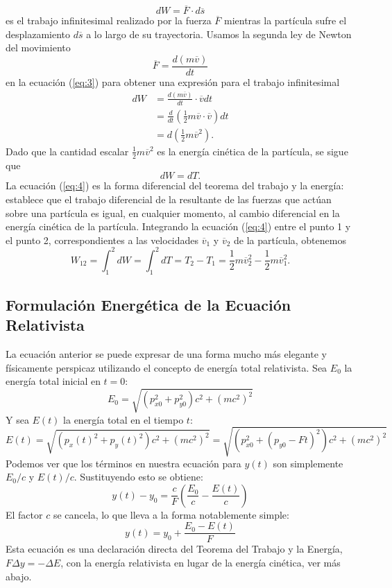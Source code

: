 \documentclass[11pt,a4paper]{article}
\begin{document}
\begin{equation}
dW = \overline{F} \cdot d\overline{s} \label{eq:3}
\end{equation}
es el trabajo infinitesimal realizado por la fuerza $\overline{F}$ mientras la partícula sufre el desplazamiento $d\overline{s}$ a lo largo de su trayectoria. Usamos la segunda ley de Newton del movimiento
\begin{equation}
\overline{F} = \frac{d(m\overline{v})}{dt}
\end{equation}
en la ecuación (\ref{eq:3}) para obtener una expresión para el trabajo infinitesimal
\begin{align*}
dW &= \frac{d(m\overline{v})}{dt} \cdot \overline{v}dt \\
&= \frac{d}{dt}\left(\frac{1}{2}m\overline{v}\cdot\overline{v}\right)dt \\
&= d\left(\frac{1}{2}m\overline{v}^{2}\right).
\end{align*}
Dado que la cantidad escalar $\frac{1}{2}m\overline{v}^{2}$ es la energía cinética de la partícula, se sigue que
\begin{equation}
dW = dT. \label{eq:4}
\end{equation}
La ecuación (\ref{eq:4}) es la forma diferencial del teorema del trabajo y la energía: establece que el trabajo diferencial de la resultante de las fuerzas que actúan sobre una partícula es igual, en cualquier momento, al cambio diferencial en la energía cinética de la partícula. Integrando la ecuación (\ref{eq:4}) entre el punto 1 y el punto 2, correspondientes a las velocidades $\overline{v}_1$ y $\overline{v}_2$ de la partícula, obtenemos
\begin{equation}
W_{12} = \int_{1}^{2} dW = \int_{1}^{2} dT = T_2 - T_1 = \frac{1}{2}m\overline{v}_{2}^{2} - \frac{1}{2}m\overline{v}_{1}^{2}. \label{eq:5}
\end{equation}



\subsection{Formulación Energética de la Ecuación Relativista}
La ecuación anterior se puede expresar de una forma mucho más elegante y físicamente perspicaz utilizando el concepto de energía total relativista.
Sea $E_0$ la energía total inicial en $t=0$:
\[ E_0 = \sqrt{(p_{x0}^2 + p_{y0}^2)c^2 + (mc^2)^2} \]
Y sea $E(t)$ la energía total en el tiempo $t$:
\[ E(t) = \sqrt{(p_x(t)^2 + p_y(t)^2)c^2 + (mc^2)^2} = \sqrt{(p_{x0}^2 + (p_{y0}-Ft)^2)c^2 + (mc^2)^2} \]
Podemos ver que los términos en nuestra ecuación para $y(t)$ son simplemente $E_0/c$ y $E(t)/c$. Sustituyendo esto se obtiene:
\[ y(t) - y_0 = \frac{c}{F} \left( \frac{E_0}{c} - \frac{E(t)}{c} \right) \]
El factor $c$ se cancela, lo que lleva a la forma notablemente simple:
\[ \boxed{y(t) = y_0 + \frac{E_0 - E(t)}{F}} \]
Esta ecuación es una declaración directa del Teorema del Trabajo y la Energía, $F \Delta y = -\Delta E$, con la energía relativista en lugar de la energía cinética, ver más abajo.
\end{document}
